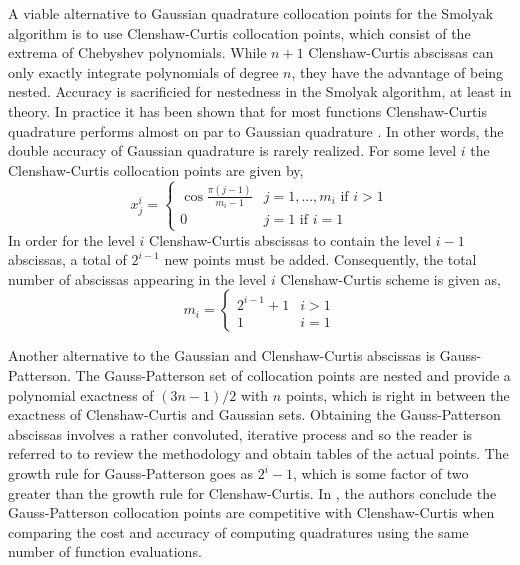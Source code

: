 A viable alternative to Gaussian quadrature collocation points for the Smolyak algorithm is to use Clenshaw-Curtis collocation points, which consist of the extrema of Chebyshev polynomials. While $n+1$ Clenshaw-Curtis abscissas can only exactly integrate polynomials of degree $n$, they have the advantage of being nested. Accuracy is sacrificied for nestedness in the Smolyak algorithm, at least in theory. In practice it has been shown that for most functions Clenshaw-Curtis quadrature performs almost on par to Gaussian quadrature \cite{TrefethenQuadrature}. In other words, the double accuracy of Gaussian quadrature is rarely realized. For some level $i$ the Clenshaw-Curtis collocation points are given by,
\begin{equation} \label{eq:cc_points}
    x_{j}^{i} = \left\{
     \begin{array}{cr}
       \cos\frac{\pi(j-1)}{m_i-1}   & j=1,...,m_i \text{ if } i>1 \\
       0   &  j=1 \text{ if } i=1
     \end{array}
   \right.
\end{equation}
In order for the level $i$ Clenshaw-Curtis abscissas to contain the level $i-1$    abscissas, a total of $2^{i-1}$ new points must be added. Consequently, the total number of abscissas appearing in the level $i$ Clenshaw-Curtis scheme is given as,
\begin{equation} \label{eq:cc_numpoints}
    m_i = \left\{
     \begin{array}{cr}
      2^{i-1}+1   & i>1 \\
      1   & i=1
     \end{array}
    \right.
\end{equation}

Another alternative to the Gaussian and Clenshaw-Curtis abscissas is Gauss-Patterson. The Gauss-Patterson set of collocation points are nested and provide  a polynomial exactness of $(3n-1)/2$ with $n$ points, which is right in between the exactness of Clenshaw-Curtis and Gaussian sets. Obtaining the Gauss-Patterson abscissas involves a rather convoluted, iterative process and so the reader is referred to \cite{GaussPatterson} to review the methodology and obtain tables of the actual points. The growth rule for Gauss-Patterson goes as $2^i-1$, which is some factor of two greater than the growth rule for Clenshaw-Curtis. In \cite{HesthavenGaussPatt}, the authors conclude the Gauss-Patterson collocation points are competitive with Clenshaw-Curtis when comparing the cost and accuracy of computing quadratures using the same number of function evaluations.       

